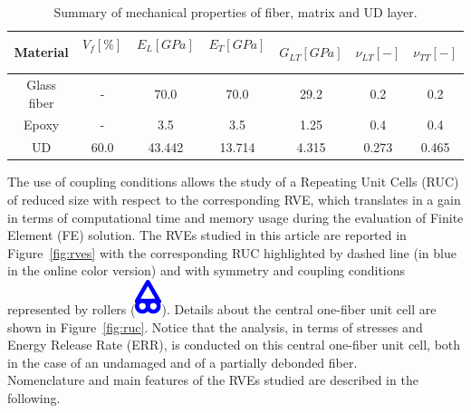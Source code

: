 \documentclass[12pt,a4paper]{article}
\begin{document}
\begin{table}[!htbp]
 \centering
 \caption{Summary of mechanical properties of fiber, matrix and UD layer.}%
 \begin{tabular}{ccccccc}
\textbf{Material} & \textbf{$V_{f}\left[\%\right]$}\  & \textbf{$E_{L}\left[GPa\right]$}\ & \textbf{$E_{T}\left[GPa\right]$}\  & \textbf{$G_{LT}\left[GPa\right]$} &\textbf{$\nu_{LT}\left[-\right]$} & \textbf{$\nu_{TT}\left[-\right]$} \\
\midrule
Glass fiber &-   & 70.0 & 70.0  & 29.2 & 0.2  & 0.2\\
Epoxy    &-& 3.5 & 3.5   & 1.25 &  0.4& 0.4\\
UD&60.0&43.442&13.714& 4.315& 0.273&0.465\\
\end{tabular}
\label{tab:phaseprop}
\end{table}

The use of coupling conditions allows the study of a Repeating Unit Cells (RUC) of reduced size with respect to the corresponding RVE, which translates in a gain in terms of computational time and memory usage during the evaluation of Finite Element (FE) solution. The RVEs studied in this article are reported in Figure~\ref{fig:rves} with the corresponding RUC highlighted by dashed line (in blue in the online color version) and with symmetry and coupling conditions represented by rollers (\includegraphics[scale=0.5]{roller.pdf}). Details about the central one-fiber unit cell are shown in Figure~\ref{fig:ruc}. Notice that the analysis, in terms of stresses and Energy Release Rate (ERR), is conducted on this central one-fiber unit cell, both in the case of an undamaged and of a partially debonded fiber.\\
Nomenclature and main features of the RVEs studied are described in the following.
\end{document}
